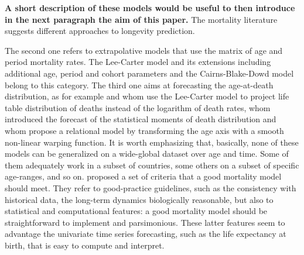 \documentclass[a4,11pt]{article}
\begin{document}


\textbf{A short description of these models would be useful to then introduce in the next paragraph the aim of this paper.} The mortality literature suggests different approaches to longevity prediction.


The second one refers to extrapolative models that use the matrix of age and period mortality rates. The Lee-Carter model \citep{LC1992} and its extensions including additional age, period and cohort parameters and the Cairns-Blake-Dowd model \citep{CBD2006} belong to this category.
The third one aims at forecasting the age-at-death distribution, as for example \cite{Oeppen08} and \cite{Bergeron} whom use the Lee-Carter model to project life table distribution of deaths instead of the logarithm of death rates, \cite{Pascariu19} whom introduced the forecast of the statistical moments of death distribution and \cite{BaselliniCamarda} whom propose a relational model by transforming the age axis with a smooth non-linear warping function. It is worth emphasizing that, basically, none of these models can be generalized on a wide-global dataset over age and time. Some of them adequately work in a subset of countries, some others on a subset of specific age-ranges, and so on. \cite{Cairns} proposed a set of criteria that a good mortality model should meet. They refer to good-practice guidelines, such as the consistency with historical data, the long-term dynamics biologically reasonable, but also to statistical and computational features: a good mortality model should be straightforward to implement and parsimonious. These latter features seem to advantage the univariate time series forecasting, such as the life expectancy at birth, that is easy to compute and interpret.\\ 
\end{document}

